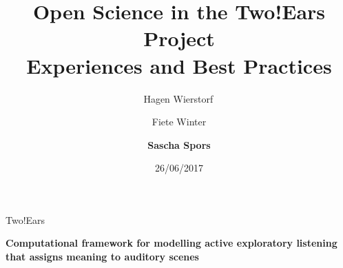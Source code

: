 \documentclass{beamer}
\begin{document}
\title{\centering Open Science in the Two!Ears Project \\ Experiences and Best Practices}
\author{Hagen Wierstorf$\,$ \and
        Fiete Winter \and
        \textbf{Sascha Spors}}
\date{26/06/2017}
\maketitle

\begin{frame}{Two!Ears}

    \centering
    \vspace{0.5cm}
    \textbf{Computational framework for modelling active exploratory
    listening that assigns meaning to auditory scenes}

    \vspace{1.0cm}


\end{frame}
\end{document}
